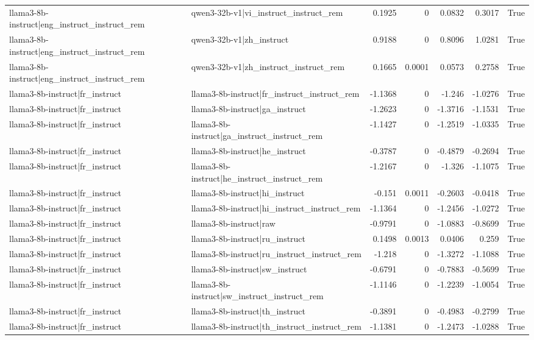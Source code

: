 \begin{table}
\begin{tabular}{l l r r r r l}
llama3-8b-instruct|eng_instruct_instruct_rem & qwen3-32b-v1|vi_instruct_instruct_rem & 0.1925 & 0 & 0.0832 & 0.3017 & True \\
llama3-8b-instruct|eng_instruct_instruct_rem & qwen3-32b-v1|zh_instruct & 0.9188 & 0 & 0.8096 & 1.0281 & True \\
llama3-8b-instruct|eng_instruct_instruct_rem & qwen3-32b-v1|zh_instruct_instruct_rem & 0.1665 & 0.0001 & 0.0573 & 0.2758 & True \\
llama3-8b-instruct|fr_instruct & llama3-8b-instruct|fr_instruct_instruct_rem & -1.1368 & 0 & -1.246 & -1.0276 & True \\
llama3-8b-instruct|fr_instruct & llama3-8b-instruct|ga_instruct & -1.2623 & 0 & -1.3716 & -1.1531 & True \\
llama3-8b-instruct|fr_instruct & llama3-8b-instruct|ga_instruct_instruct_rem & -1.1427 & 0 & -1.2519 & -1.0335 & True \\
llama3-8b-instruct|fr_instruct & llama3-8b-instruct|he_instruct & -0.3787 & 0 & -0.4879 & -0.2694 & True \\
llama3-8b-instruct|fr_instruct & llama3-8b-instruct|he_instruct_instruct_rem & -1.2167 & 0 & -1.326 & -1.1075 & True \\
llama3-8b-instruct|fr_instruct & llama3-8b-instruct|hi_instruct & -0.151 & 0.0011 & -0.2603 & -0.0418 & True \\
llama3-8b-instruct|fr_instruct & llama3-8b-instruct|hi_instruct_instruct_rem & -1.1364 & 0 & -1.2456 & -1.0272 & True \\
llama3-8b-instruct|fr_instruct & llama3-8b-instruct|raw & -0.9791 & 0 & -1.0883 & -0.8699 & True \\
llama3-8b-instruct|fr_instruct & llama3-8b-instruct|ru_instruct & 0.1498 & 0.0013 & 0.0406 & 0.259 & True \\
llama3-8b-instruct|fr_instruct & llama3-8b-instruct|ru_instruct_instruct_rem & -1.218 & 0 & -1.3272 & -1.1088 & True \\
llama3-8b-instruct|fr_instruct & llama3-8b-instruct|sw_instruct & -0.6791 & 0 & -0.7883 & -0.5699 & True \\
llama3-8b-instruct|fr_instruct & llama3-8b-instruct|sw_instruct_instruct_rem & -1.1146 & 0 & -1.2239 & -1.0054 & True \\
llama3-8b-instruct|fr_instruct & llama3-8b-instruct|th_instruct & -0.3891 & 0 & -0.4983 & -0.2799 & True \\
llama3-8b-instruct|fr_instruct & llama3-8b-instruct|th_instruct_instruct_rem & -1.1381 & 0 & -1.2473 & -1.0288 & True \\

\end{tabular}
\end{table}
